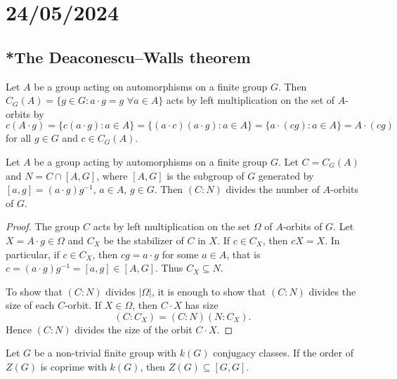 \section{24/05/2024}

\subsection{*The Deaconescu--Walls theorem}

Let $A$ be a group acting on automorphisms on a finite group $G$. Then 
$C_{G}(A)=\{g\in G:a\cdot g=g\,\,\forall a\in A\}$ acts by left multiplication 
on the set of 
$A$-orbits by 
\[
  c(A\cdot g)
  =\{c(a\cdot g):a\in A\}
  =\{(a\cdot c)(a\cdot g):a\in A\}
  =\{a\cdot (cg):a\in A\}
  =A\cdot (cg)
\]
for all $g\in G$ and $c\in C_G(A)$.


\begin{theorem}
	\label{thm:DeaconescuWalls}
	Let $A$ be a group acting by automorphisms on a finite group $G$. Let
	$C=C_{G}(A)$ and $N=C\cap [A,G]$,
	where $[A,G]$ is the subgroup of $G$ generated by $[a,g]=(a\cdot g)g^{-1}$,
	$a\in A$, $g\in G$.  Then $(C:N)$ divides the number of $A$-orbits of 
	$G$. 
\end{theorem}

\begin{proof}
  The group $C$ acts by left multiplication on the set $\Omega$ of 
  $A$-orbits of $G$. Let $X=A\cdot g\in\Omega$ and $C_X$ be the stabilizer of 
  $C$ in $X$. If $c\in C_X$, then $cX=X$. In particular, if $c\in C_X$, then 
  $cg=a\cdot g$ for some $a\in A$, that is $c=(a\cdot
  g)g^{-1}=[a,g]\in [A,G]$. Thus $C_X\subseteq N$.

  To show that $(C:N)$ divides $|\Omega|$, it is enough to show that 
  $(C:N)$ divides the size of each $C$-orbit. If $X\in\Omega$, then $C\cdot
  X$ has size 
  \[
	(C:C_X)=(C:N)(N:C_X).
  \]
  Hence $(C:N)$ divides the size of the orbit $C\cdot X$.
\end{proof}

\begin{corollary}
	\label{cor:Z(G)subset[G,G]}
  Let $G$ be a non-trivial finite group with $k(G)$ conjugacy classes. 
  If the order of $Z(G)$ is coprime with $k(G)$, then  
  $Z(G)\subseteq[G,G]$.
\end{corollary}

